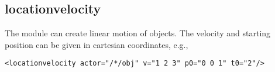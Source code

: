 \subsection{locationvelocity}\label{sec:locationvelocity}

The  module can create linear motion of
objects. The velocity  and starting position  can be
given in cartesian coordinates, e.g.,
\begin{lstlisting}[numbers=none]
<locationvelocity actor="/*/obj" v="1 2 3" p0="0 0 1" t0="2"/>
\end{lstlisting}

